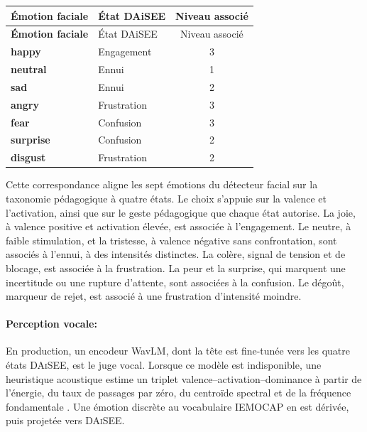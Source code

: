 {\small
\renewcommand{\arraystretch}{1.18}
\setlength{\tabcolsep}{4pt}
\begin{xltabular}{\textwidth}{|>{\bfseries}l|>{\raggedright\arraybackslash}X|c|}
\hline
{}
Émotion faciale & État DAiSEE & Niveau associé \\
\hline
\endfirsthead
\hline
{}
Émotion faciale & État DAiSEE & Niveau associé \\
\hline
\endhead
\endfoot
\endlastfoot
happy    & Engagement  & 3 \\
\hline
neutral  & Ennui     & 1 \\
\hline
sad      & Ennui     & 2 \\
\hline
angry    & Frustration & 3 \\
\hline
fear     & Confusion   & 3 \\
\hline
surprise & Confusion   & 2 \\
\hline
disgust  & Frustration & 2 \\
\hline
\end{xltabular}
\label{tab:fer-mapping}
}

Cette correspondance aligne les sept émotions du détecteur facial sur
la taxonomie pédagogique à quatre états. Le choix s'appuie sur la
valence et l'activation, ainsi que sur le geste pédagogique que chaque
état autorise. La joie, à valence positive et activation élevée, est
associée à l'engagement. Le neutre, à faible stimulation, et la
tristesse, à valence négative sans confrontation, sont associés à
l'ennui, à des intensités distinctes. La colère, signal de tension et
de blocage, est associée à la frustration. La peur et la surprise, qui
marquent une incertitude ou une rupture d'attente, sont associées à la
confusion. Le dégoût, marqueur de rejet, est associé à une frustration
d'intensité moindre.

\paragraph{Perception vocale:}
En production, un encodeur WavLM, dont la tête est fine-tunée vers
les quatre états \textsc{DAiSEE}, est le juge vocal. Lorsque ce modèle
est indisponible, une heuristique acoustique estime un triplet
valence--activation--dominance à partir de l'énergie, du taux de
passages par zéro, du centroïde spectral et de la fréquence
fondamentale \cite{baker2010better}. Une émotion discrète au
vocabulaire \textsc{IEMOCAP} en est dérivée, puis projetée vers
\textsc{DAiSEE}.

